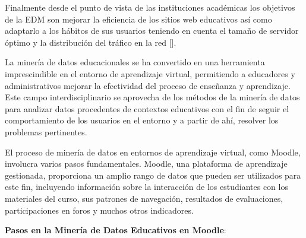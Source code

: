 Finalmente desde el punto de vista de las instituciones académicas los objetivos de la EDM son mejorar la eficiencia de los sitios web educativos así como adaptarlo a los hábitos de sus usuarios teniendo en cuenta el tamaño de servidor óptimo y la distribución del tráfico en la red [\cite{Sebastian}].  


La minería de datos educacionales se ha convertido en una herramienta imprescindible en el entorno de aprendizaje virtual, permitiendo a educadores y administrativos mejorar la efectividad del proceso de enseñanza y aprendizaje. Este campo interdisciplinario se aprovecha de los métodos de la minería de datos para analizar datos procedentes de contextos educativos con el fin de seguir el comportamiento de los usuarios en el entorno y a partir de ahí, resolver los problemas pertinentes.  


El proceso de minería de datos en entornos de aprendizaje virtual, como Moodle, involucra varios pasos fundamentales. Moodle, una plataforma de aprendizaje gestionada, proporciona un amplio rango de datos que pueden ser utilizados para este fin, incluyendo información sobre la interacción de los estudiantes con los materiales del curso, sus patrones de navegación, resultados de evaluaciones, participaciones en foros y muchos otros indicadores.  


\textbf{Pasos en la Minería de Datos Educativos en Moodle}:

